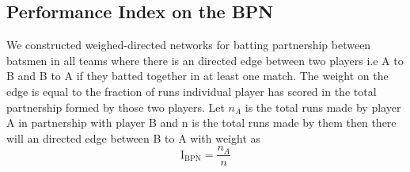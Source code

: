 \documentclass{article}
\begin{document}
\subsection{Performance Index on the BPN}
We constructed weighed-directed networks for batting partnership between batsmen in all teams where there is an directed edge between two players i.e A to B and B to A if they batted together in at least one match. The weight on the edge is equal to the fraction of runs individual player has scored in the total partnership formed by those two players. Let $n_A$ is the total runs made by player A in partnership with player B and n is the total runs made by them then there will an directed edge between B to A with weight as $$\mathrm{I_{BPN}} = \frac{n_A}{n}$$

\end{document}
